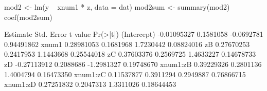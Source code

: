 \begin{Schunk}
\begin{Sinput}
 mod2 <- lm(y ~ xnum1 * z, data = dat)
 mod2sum <- summary(mod2)
 coef(mod2sum)
\end{Sinput}
\begin{Soutput}
               Estimate Std. Error    t value   Pr(>|t|)
(Intercept) -0.01095327  0.1581058 -0.0692781 0.94491862
xnum1        0.28981053  0.1681968  1.7230442 0.08824016
zB           0.27670253  0.2417953  1.1443668 0.25544018
zC           0.37603376  0.2569725  1.4633227 0.14678733
zD          -0.27113912  0.2088686 -1.2981327 0.19748670
xnum1:zB     0.39229326  0.2801136  1.4004794 0.16473350
xnum1:zC     0.11537877  0.3911294  0.2949887 0.76866715
xnum1:zD     0.27251832  0.2047313  1.3311026 0.18644453
\end{Soutput}
\end{Schunk}
